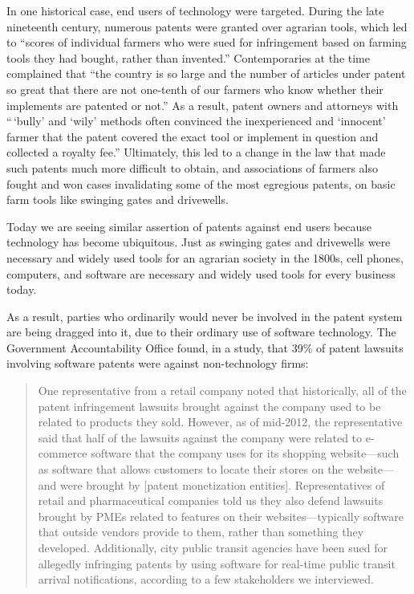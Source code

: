 \documentclass[11pt,twocolumn,titlepage]{article}
\begin{document}
In one historical case, end users of technology were targeted. During the
late nineteenth century,
numerous patents were granted over agrarian tools, which led to ``scores of
individual farmers who were sued for infringement based on farming tools they
had bought, rather than invented.'' Contemporaries at the
time complained that ``the country is so large and the number of articles under
patent so great that there are not one-tenth of our farmers who know whether
their implements are patented or not.'' As a result, patent
owners and attorneys with ``\,`bully' and `wily' methods often convinced the
inexperienced and `innocent' farmer that the patent covered the exact tool or
implement in question and collected a royalty fee.''
Ultimately, this led to a change in the law that made such patents much more
difficult to obtain, and associations of farmers also
fought and won cases invalidating some of the most egregious patents, on basic
farm tools like swinging gates and drivewells.

Today we are seeing similar assertion of patents against end users because
technology has become ubiquitous. Just as swinging gates and drivewells were
necessary and widely used tools for an agrarian society in the 1800s, cell
phones, computers, and software are necessary and widely used tools for every
business today.

As a result, parties who ordinarily would never be involved in the patent
system are being dragged into it, due to their ordinary use of software
technology.
The Government Accountability Office found, in a study, that 39\% of patent
lawsuits involving software patents were against non-technology firms:
\begin{quote}
One representative from a retail company noted that historically, all of the
patent infringement lawsuits brought against the company used to be related to
products they sold. However, as of mid-2012, the representative said that half
of the lawsuits against the company were related to e-commerce software that the
company uses for its shopping website---such as software that allows customers
to locate their stores on the website---and were brought by [patent monetization
entities]. Representatives of retail and pharmaceutical companies told us they
also defend lawsuits brought by PMEs related to features on their
websites---typically software that outside vendors provide to them, rather than
something they developed. Additionally, city public transit agencies have been
sued for allegedly infringing patents by using software for real-time public
transit arrival notifications, according to a few stakeholders we
interviewed.
\end{quote}
\end{document}
